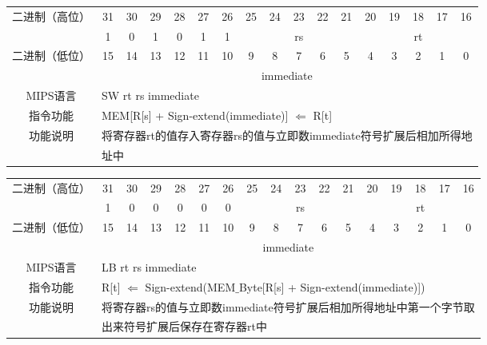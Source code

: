 \begin{table}
\begin{tabular}{|c|c|c|c|c|c|c|c|c|c|c|c|c|c|c|c|c|}
\hline
\multirow{2}{*}{二进制（高位）} &
31&30&29&28&27&26&25&24&23&22&21&20&19&18&17&16\\
\cline{2-17}
&
1&0&1&0&1&
1&
\multicolumn{5}{c|}{rs}&
\multicolumn{5}{c|}{rt}\\
\hline
\multirow{2}{*}{二进制（低位）} &
15&14&13&12&11&10&9&8&7&6&5&4&3&2&1&0\\
\cline{2-17}
&
\multicolumn{16}{c|}{immediate}\\
\hline
MIPS语言&
\multicolumn{16}{l|}{SW rt rs immediate}\\
\hline
指令功能&
\multicolumn{16}{l|}{MEM[R[s] + Sign-extend(immediate)] $\Leftarrow$ R[t]}\\
\hline
\multirow{2}{*}{功能说明}&
\multicolumn{16}{l|}{将寄存器rt的值存入寄存器rs的值与立即数immediate符号扩展后相加所得地}\\
&\multicolumn{16}{l|}{址中}\\
\hline
\end{tabular}
\end{table}

\clearpage

\begin{table}
\begin{tabular}{|c|c|c|c|c|c|c|c|c|c|c|c|c|c|c|c|c|}
\hline
\multirow{2}{*}{二进制（高位）} &
31&30&29&28&27&26&25&24&23&22&21&20&19&18&17&16\\
\cline{2-17}
&
1&0&0&0&0&
0&
\multicolumn{5}{c|}{rs}&
\multicolumn{5}{c|}{rt}\\
\hline
\multirow{2}{*}{二进制（低位）} &
15&14&13&12&11&10&9&8&7&6&5&4&3&2&1&0\\
\cline{2-17}
&
\multicolumn{16}{c|}{immediate}\\
\hline
MIPS语言&
\multicolumn{16}{l|}{LB rt rs immediate}\\
\hline
指令功能&
\multicolumn{16}{l|}{R[t] $\Leftarrow$ Sign-extend(MEM$\_$Byte[R[s] + Sign-extend(immediate)])}\\
\hline
\multirow{2}{*}{功能说明}&
\multicolumn{16}{l|}{将寄存器rs的值与立即数immediate符号扩展后相加所得地址中第一个字节取}\\
&\multicolumn{16}{l|}{出来符号扩展后保存在寄存器rt中}\\
\hline
\end{tabular}
\end{table}

